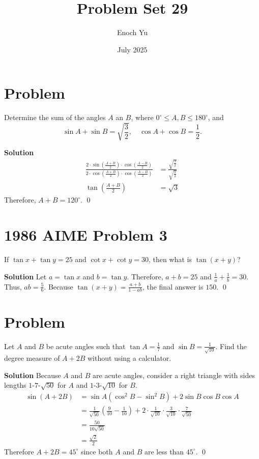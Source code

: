 \documentclass{article}
\title{Problem Set 29}
\author{Enoch Yu}
\date{July 2025}
\newenvironment{solution}{\begin{trivlist}\item[]{\bf Solution}}{\qed \end{trivlist}}
\begin{document}
\section*{Problem}
Determine the sum of the angles $A$ an $B$, where $0^\circ \le A, B \le 180^\circ$, and
\[
\sin A + \sin B = \sqrt{\frac{3}{2}}, \quad \cos A + \cos B = \frac{1}{2}.
\]
\begin{solution}
\begin{align*}
    \frac{2 \cdot \sin \left( \frac{A + B}{2} \right) \cdot \cos \left( \frac{A - B}{2} \right)}{2 \cdot \cos \left( \frac{A + B}{2} \right) \cdot \cos \left( \frac{A - B}{2} \right)} &= \frac{\sqrt{\frac{3}{2}}}{\sqrt{\frac{1}{2}}} \\
    \tan \left( \frac{A + B}{2} \right) &= \sqrt{3}
\end{align*}
Therefore, $A + B = \boxed{120^\circ}$.
\end{solution}

\section*{1986 AIME Problem 3}
If $\tan x + \tan y = 25$ and $\cot x + \cot y = 30$, then what is $\tan(x + y)$?
\begin{solution}
Let $a = \tan x$ and $b = \tan y$. Therefore, $a + b = 25$ and $\frac{1}{a} + \frac{1}{b} = 30$. Thus, $ab = \frac{5}{6}$. Because $\tan(x + y) = \frac{a + b}{1 - ab}$, the final answer is $\boxed{150}$.
\end{solution}

\section*{Problem}
Let $A$ and $B$ be acute angles such that $\tan A = \frac{1}{7}$ and $\sin B = \frac{1}{\sqrt{10}}$. Find the degree measure of $A + 2B$ without using a calculator.
\begin{solution}
Because $A$ and $B$ are acute angles, consider a right triangle with sides lengths $1$-$7$-$\sqrt{50}$ for $A$ and $1$-$3$-$\sqrt{10}$ for $B$.
\begin{align*}
    \sin(A + 2B)
    &= \sin A (\cos^2B - \sin^2B) + 2 \sin B \cos B \cos A \\
    &= \frac{1}{\sqrt{50}} \left( \frac{9}{10} - \frac{1}{10} \right) + 2 \cdot \frac{1}{\sqrt{10}} \cdot \frac{3}{\sqrt{10}} \cdot \frac{7}{\sqrt{50}} \\
    &= \frac{50}{10\sqrt{50}} \\
    &= \frac{\sqrt{2}}{2}
\end{align*}
Therefore $A + 2B = \boxed{45^\circ}$ since both $A$ and $B$ are less than $45^\circ$.
\end{solution}
\end{document}
